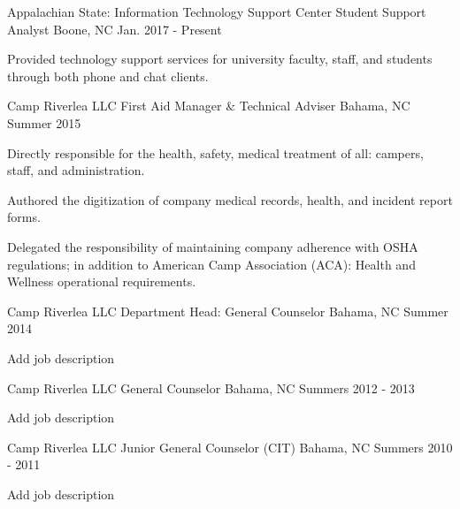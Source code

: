 \begin{cventries}
  \cventry
    {Appalachian State: Information Technology Support Center}
    {Student Support Analyst}
    {Boone, NC}
    {Jan. 2017 - Present}
    {
      \begin{cvitems}
        \item {Provided technology support services for university faculty, staff, and students through both phone and chat clients.}
      \end{cvitems}
    }
    \cventry
    {Camp Riverlea LLC}
    {First Aid Manager \& Technical Adviser}
    {Bahama, NC}
    {Summer 2015}
    {
        \begin{cvitems}
            \item{Directly responsible for the health, safety, medical treatment of all: campers, staff, and administration.}
            \item{Authored the digitization of company medical records, health, and incident report forms.}
            \item{Delegated the responsibility of maintaining company adherence with OSHA regulations; in addition to American Camp Association (ACA): Health and Wellness operational requirements.}
        \end{cvitems}
    }
    \cventry
    {Camp Riverlea LLC}
    {Department Head: General Counselor}
    {Bahama, NC}
    {Summer 2014}
    {
        \begin{cvitems}
            \item{Add job description}
        \end{cvitems}
    }
    \cventry
    {Camp Riverlea LLC}
    {General Counselor}
    {Bahama, NC}
    {Summers 2012 - 2013}
    {
        \begin{cvitems}
            \item {Add job description}
        \end{cvitems}
    }
    \cventry
    {Camp Riverlea LLC}
    {Junior General Counselor (CIT)}
    {Bahama, NC}
    {Summers 2010 - 2011}
    {
        \begin{cvitems}
            \item {Add job description}
        \end{cvitems}
    }
\end{cventries}
